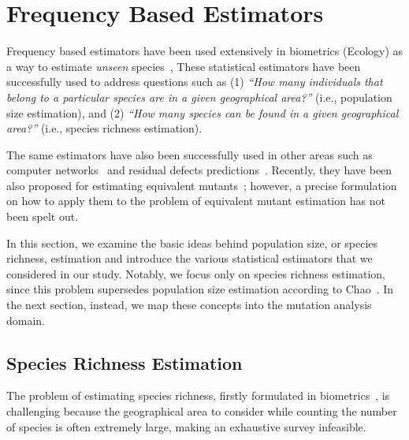 \documentclass[sigconf,review,anonymous]{acmart}
\begin{document}
\section{Frequency Based Estimators}
\label{sec:estimators}
Frequency based estimators have been used extensively in biometrics (Ecology) as
a way to estimate \emph{unseen} species~\cite{chao2016species},
These statistical estimators have been successfully used to address questions such as
(1) \emph{``How many individuals that belong to a particular species are in a given geographical area?''} (i.e., population size estimation),
and 
(2) \emph{``How many species can be found in a given geographical area?''} (i.e., species richness estimation).

The same estimators %
have also been successfully used in other areas such as
computer networks~\cite{accettura2015the} and
residual defects predictions~\cite{bohme2018stads}.
%
Recently, they have been also proposed for estimating equivalent mutants~\cite{bohme2018assurances};
however, a precise formulation on how to apply them to the problem of equivalent mutant
estimation has not been spelt out.  

In this section, we examine the basic ideas behind population size, or species richness, estimation
and introduce the various statistical estimators that we considered in our study.
%
Notably, we focus only on species richness estimation, since this problem supersedes %
population size estimation according to Chao~\cite{chao2016species}.
%
In the next section, instead, we map these concepts into the mutation analysis
domain.

\subsection{Species Richness Estimation}
\label{sec:statistical}
The problem of estimating species richness, firstly formulated in
biometrics~\cite{chao2016species}, is challenging because the geographical area
to consider while counting the number of species is often extremely large, 
making an exhaustive survey infeasible.
\end{document}
